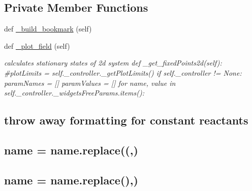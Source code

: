 \subsection*{Private Member Functions}
\begin{DoxyCompactItemize}
\item 
def \hyperlink{class_mu_mo_t_1_1_mu_mo_t_1_1_mu_mo_tfield_view_a118471f0e7fd4912146ed08084aa4b52}{\+\_\+build\+\_\+bookmark} (self)
\item 
def \hyperlink{class_mu_mo_t_1_1_mu_mo_t_1_1_mu_mo_tfield_view_a50d59419298116f738a98c864afb9d89}{\+\_\+plot\+\_\+field} (self)
\begin{DoxyCompactList}\small\item\em calculates stationary states of 2d system def \+\_\+get\+\_\+fixed\+Points2d(self)\+: \#plot\+Limits = self.\+\_\+controller.\+\_\+get\+Plot\+Limits() if self.\+\_\+controller != None\+: param\+Names = \mbox{[}\mbox{]} param\+Values = \mbox{[}\mbox{]} for name, value in self.\+\_\+controller.\+\_\+widgets\+Free\+Params.\+items()\+: \subsection*{throw away formatting for constant reactants}

\subsection*{name = name.\+replace(\textquotesingle{}(\textquotesingle{},\textquotesingle{}\textquotesingle{})}

\subsection*{name = name.\+replace(\textquotesingle{})\textquotesingle{},\textquotesingle{}\textquotesingle{})}


\end{DoxyCompactList}
\end{DoxyCompactItemize}
